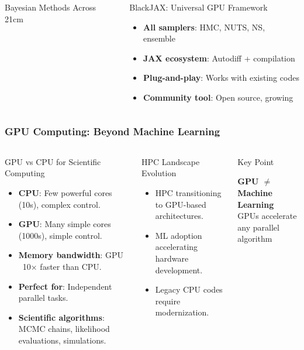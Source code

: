 \documentclass[aspectratio=169]{beamer}
\begin{document}
\begin{frame}
\begin{columns}
\begin{block}{Bayesian Methods Across 21cm}
\begin{itemize}
            \end{itemize}
        \end{block}
        \begin{block}{BlackJAX: Universal GPU Framework}
            \begin{itemize}
                \item \textbf{All samplers}: HMC, NUTS, NS, ensemble
                \item \textbf{JAX ecosystem}: Autodiff + compilation
                \item \textbf{Plug-and-play}: Works with existing codes
                \item \textbf{Community tool}: Open source, growing
            \end{itemize}
        \end{block}
    \end{columns}
\end{frame}

\begin{frame}
    \frametitle{GPU Computing: Beyond Machine Learning}
    \begin{columns}
        \begin{block}{GPU vs CPU for Scientific Computing}
            \begin{itemize}
                \item \textbf{CPU}: Few powerful cores (10s), complex control.
                \item \textbf{GPU}: Many simple cores (1000s), simple control.
                \item \textbf{Memory bandwidth}: GPU ~10× faster than CPU.
                \item \textbf{Perfect for}: Independent parallel tasks.
                \item \textbf{Scientific algorithms}: MCMC chains, likelihood evaluations, simulations.
            \end{itemize}
        \end{block}
        \begin{block}{HPC Landscape Evolution}
            \begin{itemize}
                \item HPC transitioning to GPU-based architectures.
                \item ML adoption accelerating hardware development.
                \item Legacy CPU codes require modernization.
            \end{itemize}
        \end{block}
        \begin{block}{Key Point}
            \begin{center}
                \textbf{GPU $\neq$ Machine Learning}\\
                GPUs accelerate any parallel algorithm
            \end{center}
        \end{block}
    \end{columns}
\end{frame}
\end{document}

